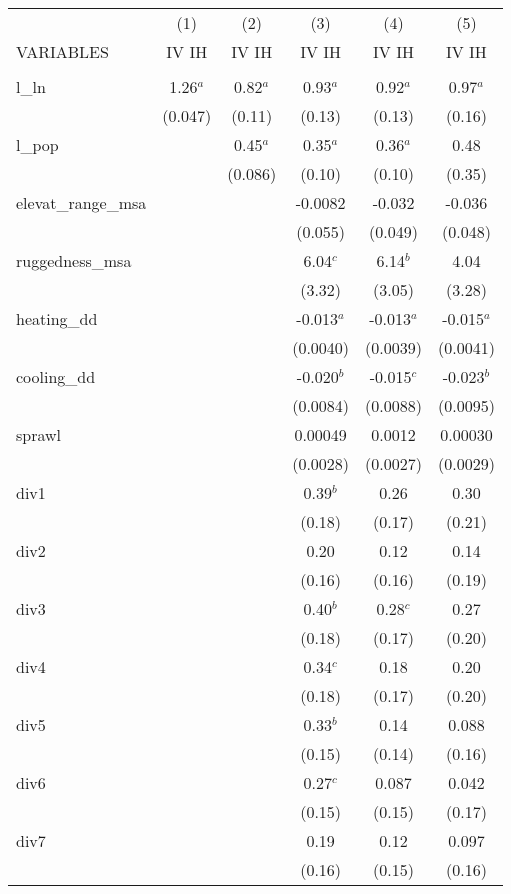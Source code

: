 \documentclass[]{article}
\begin{document}
\begin{tabular}{lccccc} \hline
 & (1) & (2) & (3) & (4) & (5) \\
VARIABLES & IV IH & IV IH & IV IH & IV IH & IV IH \\ \hline
 &  &  &  &  &  \\
l\_ln & 1.26$^a$ & 0.82$^a$ & 0.93$^a$ & 0.92$^a$ & 0.97$^a$ \\
 & (0.047) & (0.11) & (0.13) & (0.13) & (0.16) \\
l\_pop &  & 0.45$^a$ & 0.35$^a$ & 0.36$^a$ & 0.48 \\
 &  & (0.086) & (0.10) & (0.10) & (0.35) \\
elevat\_range\_msa &  &  & -0.0082 & -0.032 & -0.036 \\
 &  &  & (0.055) & (0.049) & (0.048) \\
ruggedness\_msa &  &  & 6.04$^c$ & 6.14$^b$ & 4.04 \\
 &  &  & (3.32) & (3.05) & (3.28) \\
heating\_dd &  &  & -0.013$^a$ & -0.013$^a$ & -0.015$^a$ \\
 &  &  & (0.0040) & (0.0039) & (0.0041) \\
cooling\_dd &  &  & -0.020$^b$ & -0.015$^c$ & -0.023$^b$ \\
 &  &  & (0.0084) & (0.0088) & (0.0095) \\
sprawl &  &  & 0.00049 & 0.0012 & 0.00030 \\
 &  &  & (0.0028) & (0.0027) & (0.0029) \\
div1 &  &  & 0.39$^b$ & 0.26 & 0.30 \\
 &  &  & (0.18) & (0.17) & (0.21) \\
div2 &  &  & 0.20 & 0.12 & 0.14 \\
 &  &  & (0.16) & (0.16) & (0.19) \\
div3 &  &  & 0.40$^b$ & 0.28$^c$ & 0.27 \\
 &  &  & (0.18) & (0.17) & (0.20) \\
div4 &  &  & 0.34$^c$ & 0.18 & 0.20 \\
 &  &  & (0.18) & (0.17) & (0.20) \\
div5 &  &  & 0.33$^b$ & 0.14 & 0.088 \\
 &  &  & (0.15) & (0.14) & (0.16) \\
div6 &  &  & 0.27$^c$ & 0.087 & 0.042 \\
 &  &  & (0.15) & (0.15) & (0.17) \\
div7 &  &  & 0.19 & 0.12 & 0.097 \\
 &  &  & (0.16) & (0.15) & (0.16) \\

\end{tabular}
\end{document}
